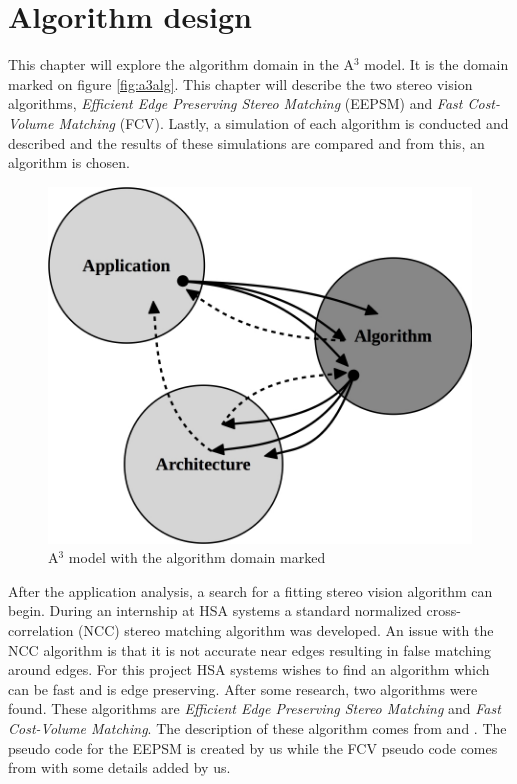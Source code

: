 \chapter{Algorithm design} \label{ch:alganalysis}
This chapter will explore the algorithm domain in the A$^3$ model. It is the domain marked on figure \vref{fig:a3alg}. This chapter will describe the two stereo vision algorithms, \textit{Efficient Edge Preserving Stereo Matching} (EEPSM) and \textit{Fast Cost-Volume Matching} (FCV). Lastly, a simulation of each algorithm is conducted and described and the results of these simulations are compared and from this, an algorithm is chosen.\\

\begin{figure}[ht!]
  \centering
  \includegraphics[scale=0.25]{figures/a3alg}
  \caption{A$^3$ model with the algorithm domain marked}
  \label{fig:a3alg}
\end{figure}

After the application analysis, a search for a fitting stereo vision algorithm can begin. During an internship at HSA systems a standard normalized cross-correlation (NCC) stereo matching algorithm was developed. An issue with the NCC algorithm is that it is not accurate near edges resulting in false matching around edges. For this project HSA systems wishes to find an algorithm which can be fast and is edge preserving. After some research, two algorithms were found. These algorithms are \textit{Efficient Edge Preserving Stereo Matching} and \textit{Fast Cost-Volume Matching}. The description of these algorithm comes from \cite{cciugla2011efficient} and \cite{hosni2013fast}. The pseudo code for the EEPSM is created by us while the FCV pseudo code comes from \cite{he2013guided} with some details added by us.

